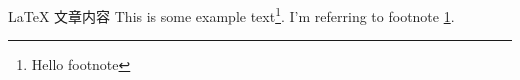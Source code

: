 \documentclass{article}
\begin{document}
\LaTeX
文章内容
This is some example text\footnote{\label{myfootnote}Hello footnote}.
I'm referring to footnote \ref{myfootnote}.
\end{document}
